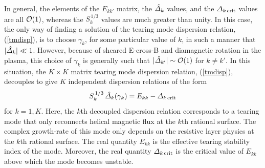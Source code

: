 \documentclass[12pt,prb,aps]{revtex4-1}
\begin{document}
In general, the elements of the $E_{kk'}$ matrix, the $\hat{\mit\Delta}_k$ values, and  the ${\mit\Delta}_{k\,{\rm crit}}$ values are all ${\cal O}(1)$, whereas the
$S_k^{\,1/3}$ values are much greater than unity. In this case, the only way of finding a solution of the tearing mode dispersion relation, (\ref{tmdisp}), is
to choose $\gamma_k$, for some particular value of $k$,  in such a manner that $|\hat{\mit\Delta}_k|\ll 1$. However, because of sheared E-cross-B and diamagnetic rotation in  the plasma, 
this choice of $\gamma_k$ is generally such that $|\hat{\mit\Delta}_{k'}|\sim{\cal O}(1)$ for $k\neq k'$.\cite{am1} In this situation, the $K\times K$ 
matrix tearing mode dispersion relation, (\ref{tmdisp}), decouples to give $K$ independent dispersion relations of the form\,\cite{am1}
\begin{equation}\label{decouple}
S_k^{\,1/3}\,\hat{\mit\Delta}_k(\gamma_k) = E_{kk}-{\mit\Delta}_{k\,{\rm crit}}
\end{equation}
for $k=1,K$. Here, the $k$th decoupled dispersion relation corresponds to a tearing mode that only reconnects helical magnetic flux at the
$k$th rational surface. The complex growth-rate of this mode only depends on the resistive layer physics at the $k$th rational surface. The
real quantity $E_{kk}$ is the effective tearing stability index of the mode.\cite{fkr} Moreover, the real quantity ${\mit\Delta}_{k\,{\rm crit}}$ is the critical
value of $E_{kk}$ above which the mode becomes unstable. 
\end{document}
